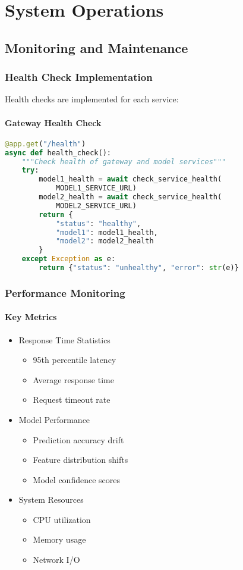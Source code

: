 \documentclass[12pt,a4paper]{report}
\begin{document}
\chapter{System Operations}
\section{Monitoring and Maintenance}
\subsection{Health Check Implementation}
Health checks are implemented for each service:

\subsubsection{Gateway Health Check}
\begin{lstlisting}[language=Python]
@app.get("/health")
async def health_check():
    """Check health of gateway and model services"""
    try:
        model1_health = await check_service_health(
            MODEL1_SERVICE_URL)
        model2_health = await check_service_health(
            MODEL2_SERVICE_URL)
        return {
            "status": "healthy",
            "model1": model1_health,
            "model2": model2_health
        }
    except Exception as e:
        return {"status": "unhealthy", "error": str(e)}
\end{lstlisting}

\subsection{Performance Monitoring}
\subsubsection{Key Metrics}
\begin{itemize}
    \item Response Time Statistics
    \begin{itemize}
        \item 95th percentile latency
        \item Average response time
        \item Request timeout rate
    \end{itemize}
    \item Model Performance
    \begin{itemize}
        \item Prediction accuracy drift
        \item Feature distribution shifts
        \item Model confidence scores
    \end{itemize}
    \item System Resources
    \begin{itemize}
        \item CPU utilization
        \item Memory usage
        \item Network I/O
    \end{itemize}
\end{itemize}
\end{document}
